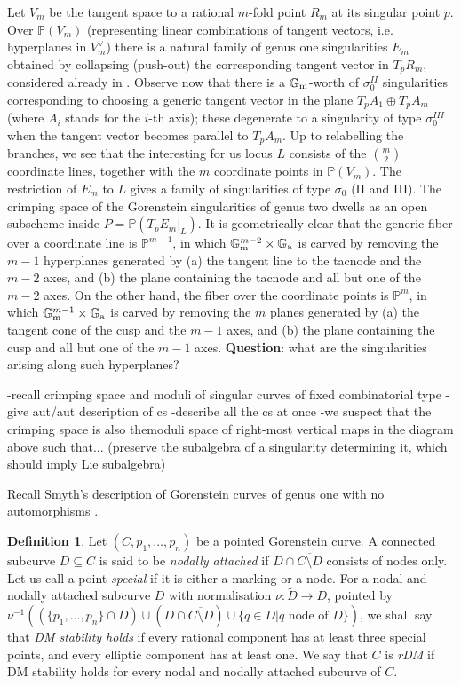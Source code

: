 \documentclass[11pt]{amsart}
\newcommand{\PP}{\mathbb P}
\renewcommand{\to}{\rightarrow}
\newcommand{\Gm}{\mathbb{G}_{\rm{m}}}
\newcommand{\Ga}{\mathbb{G}_{\rm{a}}}
\theoremstyle{plain}
\theoremstyle{definition}
\newtheorem{dfn}[thm]{Definition}
\begin{document}
Let $V_m$ be the tangent space to a rational $m$-fold point $R_m$ at its singular point $p$. Over $\PP(V_m)$ (representing linear combinations of tangent vectors, i.e. hyperplanes in $V_m^\vee$) there is a natural family of genus one singularities $E_m$ obtained by collapsing (push-out) the corresponding tangent vector in $T_pR_m$, considered already in \cite[\S2.2]{SMY2}. Observe now that there is a $\Gm$-worth of $\sigma_0^{II}$ singularities corresponding to choosing a generic tangent vector in the plane $T_pA_1\oplus T_pA_m$ (where $A_i$ stands for the $i$-th axis); these degenerate to a singularity of type $\sigma_0^{III}$ when the tangent vector becomes parallel to $T_pA_m$. Up to relabelling the branches, we see that the interesting for us locus $L$ consists of the $\binom{m}{2}$ coordinate lines, together with the $m$ coordinate points in $\PP(V_m)$. The restriction of $E_m$ to $L$ gives a family of singularities of type $\sigma_0$ (II and III). The crimping space of the Gorenstein singularities of genus two dwells as an open subscheme inside $P=\PP(T_p E_m|_L)$. It is geometrically clear that the generic fiber over a coordinate line is $\PP^{m-1}$, in which $\Gm^{m-2}\times\Ga$ is carved by removing the $m-1$ hyperplanes generated by (a) the tangent line to the tacnode and the $m-2$ axes, and (b) the plane containing the tacnode and all but one of the $m-2$ axes. On the other hand, the fiber over the coordinate points is $\PP^m$, in which $\Gm^{m-1}\times\Ga$ is carved by removing the $m$ planes generated by (a) the tangent cone of the cusp and the $m-1$ axes, and (b) the plane containing the cusp and all but one of the $m-1$ axes. \textbf{Question}: what are the singularities arising along such hyperplanes?

-recall crimping space and moduli of singular curves of fixed combinatorial type
-give aut/aut description of cs
-describe all the cs at once
-we suspect that the crimping space is also themoduli space of right-most vertical maps in the diagram above such that... (preserve the subalgebra of a singularity determining it, which should imply Lie subalgebra)

Recall Smyth's description of Gorenstein curves of genus one with no automorphisms \cite[Proposition 2.3, Corollary 2.4]{SMY1}.

\begin{dfn}
 Let $(C,p_1,\ldots,p_n)$ be a pointed Gorenstein curve. A connected subcurve $D\subseteq C$ is said to be \emph{nodally attached} if $D\cap\overline{C\setminus D}$ consists of nodes only. Let us call a point \emph{special} if it is either a marking or a node. For a nodal and nodally attached subcurve $D$ with normalisation $\nu\colon \tilde D\to D$, pointed by $\nu^{-1}\left((\{p_1,\ldots,p_n\}\cap D)\cup (D\cap\overline{C\setminus D})\cup\{q\in D|q\text{ node of } D\}\right)$, we shall say that \emph{DM stability holds} if every rational component has at least three special points, and every elliptic component has at least one. We say that $C$ is \emph{rDM} if DM stability holds for every nodal and nodally attached subcurve of $C$.
\end{dfn}
\end{document}
